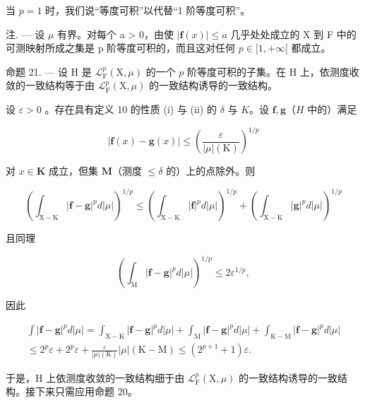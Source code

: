 当 \(p = 1\) 时，我们说“等度可积”以代替“1 阶等度可积”。

注. --- 设 \(\mu\) 有界。对每个 a \textgreater{} 0，由使 \(|\mathbf{f}(x)| \leqslant a\) 几乎处处成立的 X 到 F 中的可测映射所成之集是 p 阶等度可积的，而且这对任何 \(p \in [1, +\infty[\) 都成立。

命题 21. --- 设 H 是 \(\mathcal{L}_{\mathrm{F}}^{p}(\mathrm{X},\mu)\) 的一个 \(p\) 阶等度可积的子集。在 H 上，依测度收敛的一致结构等于由 \(\mathcal{L}_{\mathrm{F}}^{p}(\mathrm{X},\mu)\) 的一致结构诱导的一致结构。

设 \(\varepsilon > 0\) 。存在具有定义 10 的性质 (i) 与 (ii) 的 \(\delta\) 与 \(K\)。设 \(\mathbf{f}, \mathbf{g}\)（\(H\) 中的）满足

\[
| \mathbf {f} (x) - \mathbf {g} (x) | \leqslant \left(\frac {\varepsilon}{| \mu | (\mathrm{K})}\right) ^ {1 / p}
\]

对 \(x \in \mathbf{K}\) 成立，但集 \(\mathbf{M}\)（测度 \(\leqslant \delta\) 的）上的点除外。则

\[
\left(\int_ {\mathrm{X} - \mathrm{K}} | \mathbf {f} - \mathbf {g} | ^ {p} d | \mu |\right) ^ {1 / p} \leqslant \left(\int_ {\mathrm{X} - \mathrm{K}} | \mathbf {f} | ^ {p} d | \mu |\right) ^ {1 / p} + \left(\int_ {\mathrm{X} - \mathrm{K}} | \mathbf {g} | ^ {p} d | \mu |\right) ^ {1 / p}
\]

且同理

\[
\left(\int_ {\mathrm{M}} | \mathbf {f} - \mathbf {g} | ^ {p} d | \mu |\right) ^ {1 / p} \leqslant 2 \varepsilon^ {1 / p},
\]

因此

\[
\begin{array}{c} \int | \mathbf {f} - \mathbf {g} | ^ {p} d | \mu | = \int_ {\mathrm{X-K}} | \mathbf {f} - \mathbf {g} | ^ {p} d | \mu | + \int_ {\mathrm{M}} | \mathbf {f} - \mathbf {g} | ^ {p} d | \mu | + \int_ {\mathrm{K-M}} | \mathbf {f} - \mathbf {g} | ^ {p} d | \mu | \\ \leqslant 2 ^ {p} \varepsilon + 2 ^ {p} \varepsilon + \frac {\varepsilon}{| \mu | (\mathrm{K})} | \mu | (\mathrm{K-M}) \leqslant (2 ^ {p + 1} + 1) \varepsilon . \end{array}
\]

于是，H 上依测度收敛的一致结构细于由 \(\mathcal{L}_{\mathrm{F}}^{p}(\mathrm{X},\mu)\) 的一致结构诱导的一致结构。接下来只需应用命题 20。

